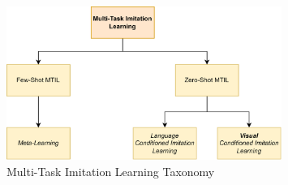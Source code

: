 \begin{figure}[t]
    \centering
    \includegraphics[width=0.8\textwidth]{figures/images/MTIL_taxonomy.png}
    \caption{Multi-Task Imitation Learning Taxonomy}
    \label{fig:mtil_taxonomy}
    
\end{figure}
